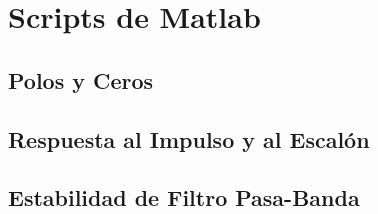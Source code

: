 \chapter{Scripts de Matlab}
\section{Polos y Ceros}
\begin{figure}[H]
  
\end{figure}

\section{Respuesta al Impulso y al Escalón}
\begin{figure}[H]
  
\end{figure}

\section{Estabilidad de Filtro Pasa-Banda}
\begin{figure}[H]
  
\end{figure}